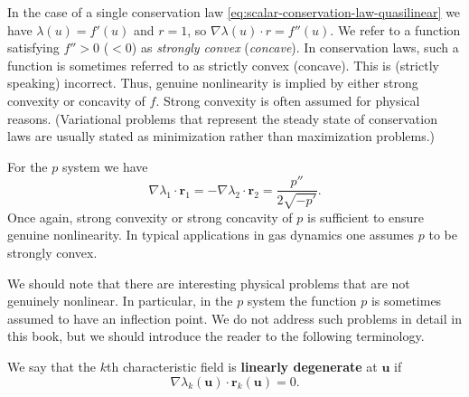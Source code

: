 \begin{Example}
\label{ex:scalar-genuine-nonlinearity}
In the case of a single conservation law \eqref{eq:scalar-conservation-law-quasilinear} we have $\lambda(u)=f'(u)$ and $r=1$, so $\nabla\lambda(u)\cdot r=f''(u)$. We refer to a function satisfying $f''>0$ ($<0$) as \emph{strongly convex} (\emph{concave}). In conservation laws, such a function is sometimes referred to as strictly convex (concave). This is (strictly speaking) incorrect. Thus, genuine nonlinearity is implied by either strong convexity or concavity of $f$. Strong convexity is often assumed for physical reasons. (Variational problems that represent the steady state of conservation laws are usually stated as minimization rather than maximization problems.)
\end{Example}

\begin{Example}
\label{ex:p-system-genuine-nonlinearity}
For the $p$ system we have
\begin{equation}\label{eq:p-system-genuine-nonlinearity}
\nabla\lambda_1\cdot\bm{r}_1=-\nabla\lambda_2\cdot\bm{r}_2=\dfrac{p''}{2\sqrt{-p'}}.
\end{equation}
Once again, strong convexity or strong concavity of $p$ is sufficient to ensure genuine nonlinearity. In typical applications in gas dynamics one assumes $p$ to be strongly convex.
\end{Example}

We should note that there are interesting physical problems that are not genuinely nonlinear. In particular, in the $p$ system the function $p$ is sometimes assumed to have an inflection point. We do not address such problems in detail in this book, but we should introduce the reader to the following terminology.

\begin{Definition}
\label{def:linear-degeneracy}
We say that the $k$th characteristic field is \textbf{linearly degenerate} at $\bm{u}$ if
\begin{equation}\label{eq:linear-degeneracy-definition}
\nabla\lambda_k(\bm{u})\cdot\bm{r}_k(\bm{u})=0.
\end{equation}

\end{Definition}
